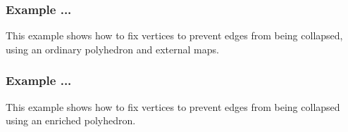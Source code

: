 \subsubsection{Example ...}

This example shows how to fix vertices to prevent edges from being collapsed, using an ordinary polyhedron and external maps.



\subsubsection{Example ...}

This example shows how to fix vertices to prevent edges from being collapsed using an enriched polyhedron.




